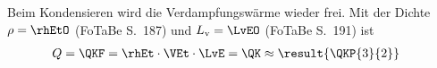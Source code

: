 Beim Kondensieren wird die Verdampfungswärme wieder frei. Mit der Dichte $\rho = \rhEtO$ (FoTaBe S.~187) und $L_\text{v} = \LvEO$ (FoTaBe S.~191) ist
\begin{align}
 Q &= \QKF = \rhEt\cdot\VEt\cdot\LvE = \QK \approx \result{\QKP{3}{2}}
\end{align}
